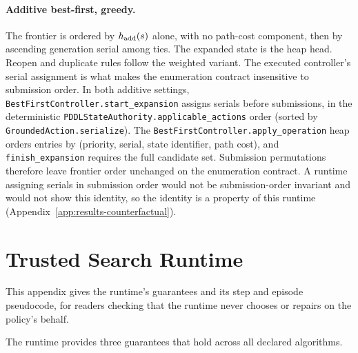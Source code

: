 \paragraph{Additive best-first, greedy.}
The frontier is ordered by $h_{\rm add}(s)$ alone, with no path-cost component, then by ascending generation serial among ties. The expanded state is the heap head. Reopen and duplicate rules follow the weighted variant.
The executed controller's serial assignment is what makes the enumeration contract insensitive to submission order. In both additive settings, \texttt{BestFirstController.start\_expansion} assigns serials before submissions, in the deterministic \texttt{PDDLStateAuthority.applicable\_actions} order (sorted by \texttt{GroundedAction.serialize}). The \texttt{BestFirstController.apply\_operation} heap orders entries by (priority, serial, state identifier, path cost), and \texttt{finish\_expansion} requires the full candidate set. Submission permutations therefore leave frontier order unchanged on the enumeration contract. A runtime assigning serials in submission order would not be submission-order invariant and would not show this identity, so the identity is a property of this runtime (Appendix~\ref{app:results-counterfactual}).


\section{Trusted Search Runtime}
\label{app:runtime}

This appendix gives the runtime's guarantees and its step and episode pseudocode, for readers checking that the runtime never chooses or repairs on the policy's behalf.

The runtime provides three guarantees that hold across all declared algorithms.

